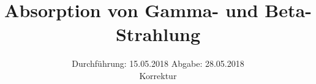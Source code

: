 

\subject{704}
\title{Absorption von Gamma- und Beta-Strahlung}
\date{%
  Durchführung: 15.05.2018
  \hspace{3em}
  Abgabe: 28.05.2018 \\
  Korrektur
}



\maketitle
\thispagestyle{empty}
\tableofcontents
\newpage






\printbibliography{}


